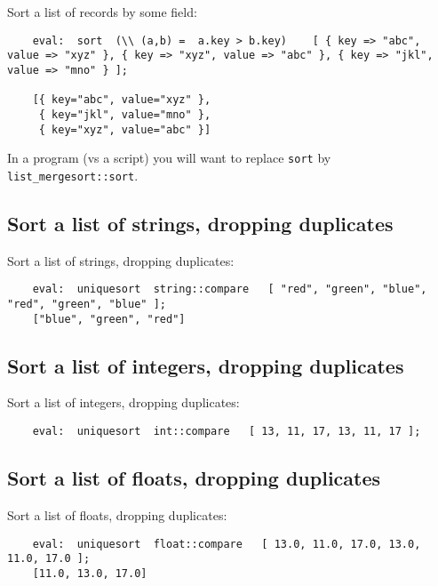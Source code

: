 Sort a list of records by some field:
\begin{verbatim}
    eval:  sort  (\\ (a,b) =  a.key > b.key)    [ { key => "abc", value => "xyz" }, { key => "xyz", value => "abc" }, { key => "jkl", value => "mno" } ];

    [{ key="abc", value="xyz" }, 
     { key="jkl", value="mno" }, 
     { key="xyz", value="abc" }]
\end{verbatim}

In a program (vs a script) you will want to replace {\tt sort} by {\tt list\_mergesort::sort}.

\cutend*

\subsection{Sort a list of strings, dropping duplicates}

Sort a list of strings, dropping duplicates:
\begin{verbatim}
    eval:  uniquesort  string::compare   [ "red", "green", "blue", "red", "green", "blue" ];
    ["blue", "green", "red"]
\end{verbatim}

\cutend*

\subsection{Sort a list of integers, dropping duplicates}

Sort a list of integers, dropping duplicates:
\begin{verbatim}
    eval:  uniquesort  int::compare   [ 13, 11, 17, 13, 11, 17 ];
\end{verbatim}

\cutend*

\subsection{Sort a list of floats, dropping duplicates}

Sort a list of floats, dropping duplicates:
\begin{verbatim}
    eval:  uniquesort  float::compare   [ 13.0, 11.0, 17.0, 13.0, 11.0, 17.0 ];
    [11.0, 13.0, 17.0]
\end{verbatim}

